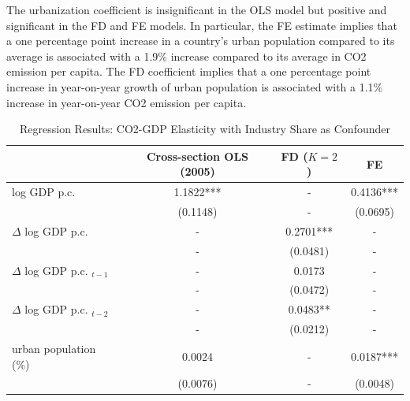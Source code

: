 \documentclass[12pt, a4paper]{article}
\begin{document}
The urbanization coefficient is insignificant in the OLS model but positive and significant in the FD and FE models. In particular, the FE estimate implies that a one percentage point increase in a country's urban population compared to its average is associated with a 1.9\% increase compared to its average in CO2 emission per capita. The FD coefficient implies that a one percentage point increase in year-on-year growth of urban population is associated with a 1.1\% increase in year-on-year CO2 emission per capita.

\begin{table}[H]
\centering
\begin{threeparttable}
\caption{Regression Results: CO2-GDP Elasticity with Industry Share as Confounder}
\label{tab:results-confounder}
\begin{tabularx}{\textwidth}{Xccc}
\toprule
& Cross-section OLS (2005) & FD ($K=2$) & FE \\
\midrule
log GDP p.c.            & 1.1822***  & - & 0.4136*** \\
                        & (0.1148)   & - & (0.0695) \\[0.3em]

$\Delta$ log GDP p.c.   & - & 0.2701*** & - \\
                        & - & (0.0481)  & - \\[0.3em]

$\Delta$ log GDP p.c. $_{t-1}$  & - & 0.0173   & -\\
                                & - & (0.0472) & -\\[0.3em]

$\Delta$ log GDP p.c. $_{t-2}$  & - & 0.0483** & -\\
                                & - & (0.0212) & -\\[0.3em] 
                                
urban population (\%)             & 0.0024 & - & 0.0187*** \\
                                & (0.0076) & - & (0.0048)  \\[0.3em]


\end{tabularx}
\end{threeparttable}
\end{table}
\end{document}
